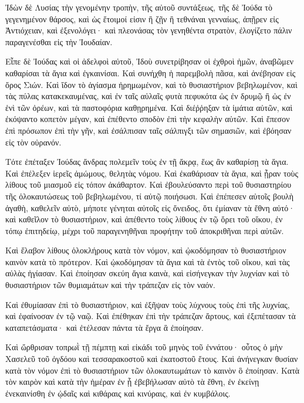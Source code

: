 {\par }{\PP {}Ἰδὼν δὲ Λυσίας τὴν γενομένην τροπὴν, τῆς αὐτοῦ συντάξεως, τῆς δὲ Ἰούδα τὸ γεγενημένον θάρσος, καὶ ὡς ἕτοιμοί εἰσιν ἢ ζῇν ἢ τεθνάναι γενναίως, ἀπῇρεν εἰς Ἀντιόχειαν, καὶ ἐξενολόγει· καὶ πλεονάσας τὸν γενηθέντα στρατὸν, ἐλογίζετο πάλιν παραγενέσθαι εἰς τὴν Ἰουδαίαν.
\par }{\PP {}Εἶπε δὲ Ἰούδας καὶ οἱ ἀδελφοὶ αὐτοῦ, Ἰδοὺ συνετρίβησαν οἱ ἐχθροὶ ἡμῶν, ἀναβῶμεν καθαρίσαι τὰ ἅγια καὶ ἐγκαινίσαι.
Καὶ συνήχθη ἡ παρεμβολὴ πᾶσα, καὶ ἀνέβησαν εἰς ὄρος Σιών.
Καὶ ἴδον τὸ ἁγίασμα ἠρημωμένον, καὶ τὸ θυσιαστήριον βεβηλωμένον, καὶ τὰς πύλας κατακεκαυμένας, καὶ ἐν ταῖς αὐλαῖς φυτὰ πεφυκότα ὡς ἐν δρυμῷ ἢ ὡς ἐν ἑνὶ τῶν ὀρέων, καὶ τὰ παστοφόρια καθῃρημένα.
Καὶ διέῤῥηξαν τὰ ἱμάτια αὐτῶν, καὶ ἐκόψαντο κοπετὸν μέγαν, καὶ ἐπέθεντο σποδὸν ἐπὶ τὴν κεφαλὴν αὐτῶν.
Καὶ ἔπεσον ἐπὶ πρόσωπον ἐπὶ τὴν γῆν, καὶ ἐσάλπισαν ταῖς σάλπιγξι τῶν σημασιῶν, καὶ ἐβόησαν εἰς τὸν οὐρανόν.
\par }{\PP {}Τότε ἐπέταξεν Ἰούδας ἄνδρας πολεμεῖν τοὺς ἐν τῇ ἄκρᾳ, ἕως ἂν καθαρίσῃ τὰ ἅγια.
Καὶ ἐπέλεξεν ἱερεῖς ἀμώμους, θελητὰς νόμου.
Καὶ ἐκαθάρισαν τὰ ἅγια, καὶ ᾖραν τοὺς λίθους τοῦ μιασμοῦ εἰς τόπον ἀκάθαρτον.
Καὶ ἐβουλεύσαντο περὶ τοῦ θυσιαστηρίου τῆς ὁλοκαυτώσεως τοῦ βεβηλωμένου, τί αὐτῷ ποιήσωσι.
Καὶ ἐπέπεσεν αὐτοῖς βουλὴ ἀγαθὴ, καθελεῖν αὐτὸ, μήποτε γένηται αὐτοῖς εἰς ὄνειδος, ὅτι ἐμίαναν τὰ ἔθνη αὐτό· καὶ καθεῖλον τὸ θυσιαστήριον,
καὶ ἀπέθεντο τοὺς λίθους ἐν τῷ ὄρει τοῦ οἴκου, ἐν τόπῳ ἐπιτηδείῳ, μέχρι τοῦ παραγενηθῆναι προφήτην τοῦ ἀποκριθῆναι περὶ αὐτῶν.
\par }{\PP {}Καὶ ἔλαβον λίθους ὁλοκλήρους κατὰ τὸν νόμον, καὶ ᾠκοδόμησαν τὸ θυσιαστήριον καινὸν κατὰ τὸ πρότερον.
Καὶ ᾠκοδόμησαν τὰ ἅγια καὶ τὰ ἐντὸς τοῦ οἴκου, καὶ τὰς αὐλὰς ἡγίασαν.
Καὶ ἐποίησαν σκεύη ἅγια καινὰ, καὶ εἰσήνεγκαν τὴν λυχνίαν καὶ τὸ θυσιαστήριον τῶν θυμιαμάτων καὶ τὴν τράπεζαν εἰς τὸν ναόν.
\par }{\PP {}Καὶ ἐθυμίασαν ἐπὶ τὸ θυσιαστήριον, καὶ ἐξῆψαν τοὺς λύχνους τοὺς ἐπὶ τῆς λυχνίας, καὶ ἐφαίνοσαν ἐν τῷ ναῷ.
Καὶ ἐπέθηκαν ἐπὶ τὴν τράπεζαν ἄρτους, καὶ ἐξεπέτασαν τὰ καταπετάσματα· καὶ ἐτέλεσαν πάντα τὰ ἔργα ἃ ἐποίησαν.
\par }{\PP {}Καὶ ὤρθρισαν τοπρωῒ τῇ πέμπτῃ καὶ εἰκάδι τοῦ μηνὸς τοῦ ἐννάτου· οὗτος ὁ μὴν Χασελεῦ τοῦ ὀγδόου καὶ τεσσαρακοστοῦ καὶ ἑκατοστοῦ ἔτους.
Καὶ ἀνήνεγκαν θυσίαν κατὰ τὸν νόμον ἐπὶ τὸ θυσιαστήριον τῶν ὁλοκαυτωμάτων τὸ καινὸν ὃ ἐποίησαν.
Κατὰ τὸν καιρὸν καὶ κατὰ τὴν ἡμέραν ἐν ᾗ ἐβεβήλωσαν αὐτὸ τὰ ἔθνη, ἐν ἐκείνῃ ἐνεκαινίσθη ἐν ᾠδαῖς καὶ κιθάραις καὶ κινύραις, καὶ ἐν κυμβάλοις.
}
